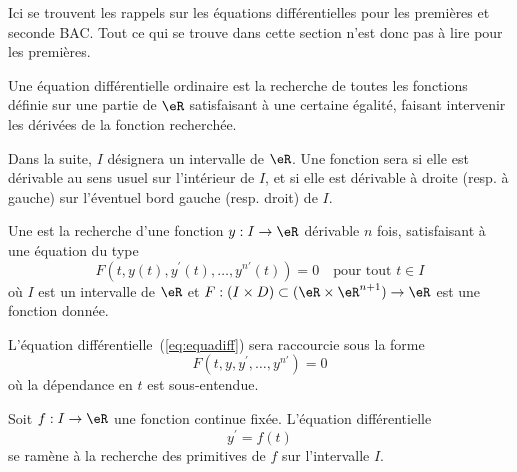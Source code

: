 

Ici se trouvent les rappels sur les équations différentielles pour les premières et seconde BAC. Tout ce qui se trouve dans cette section n'est donc pas à lire pour les premières.

\label{sec:equadiff1erordre}
Une équation différentielle ordinaire est la recherche de toutes les fonctions définie sur une partie de $\eR$ satisfaisant à une certaine égalité, faisant intervenir les dérivées de la fonction recherchée.


Dans la suite, $I$ désignera un intervalle de $\eR$. Une fonction sera  si elle est dérivable au sens usuel sur l'intérieur de $I$, et si elle est dérivable à droite (resp. à gauche) sur l'éventuel bord gauche (resp. droit) de $I$.

\begin{definition}
  Une  est la recherche d'une fonction $y : I \to \eR$ dérivable $n$ fois, satisfaisant à une équation du type
  \begin{equation}\label{eq:equadiff}
    F(t, y(t), y^\prime(t), \ldots, y^{n\prime}(t)) = 0 \quad \text{pour tout $t \in I$}
  \end{equation}
  où $I$ est un intervalle de $\eR$ et \begin{math}F : (I \times D) \subset (\eR\times\eR^{n+1})\to \eR\end{math} est une fonction donnée.
\end{definition}

\begin{remark}
L'équation différentielle~(\ref{eq:equadiff}) sera raccourcie sous la forme
  \begin{equation}
    F(t, y, y^\prime, \ldots, y^{n\prime}) = 0
  \end{equation}
  où la dépendance en $t$ est sous-entendue.
\end{remark}

\begin{example}
	Soit $f : I \to \eR$ une fonction continue fixée. L'équation différentielle
	\begin{equation}
		y^\prime = f(t)
	\end{equation}
	se ramène à la recherche des primitives de $f$ sur l'intervalle $I$.
\end{example}

